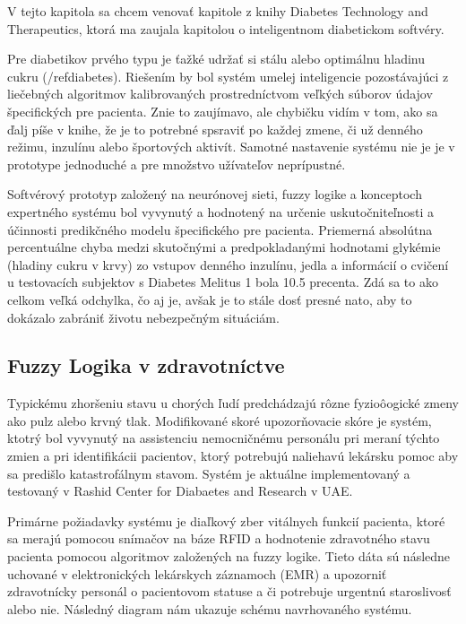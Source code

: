 V tejto kapitola sa chcem venovať kapitole z knihy Diabetes Technology and Therapeutics, ktorá ma zaujala kapitolou o inteligentnom diabetickom softvéry.

Pre diabetikov prvého typu je ťažké udržať si stálu alebo optimálnu hladinu cukru (/ref{diabetes}). Riešením by bol systém umelej inteligencie pozostávajúci z liečebných algoritmov kalibrovaných prostredníctvom veľkých súborov údajov špecifických pre pacienta.\cite{2000} Znie to zaujímavo, ale chybičku vidím v tom, ako sa ďalj píše v knihe, že je to potrebné spsraviť po každej zmene, či už denného režimu, inzulínu alebo športových aktivít. Samotné nastavenie systému nie je je v prototype jednoduché a pre množstvo užívateľov neprípustné. 

Softvérový prototyp založený na neurónovej sieti, fuzzy logike a konceptoch expertného systému bol vyvynutý a hodnotený na určenie uskutočniteľnosti a účinnosti predikčného modelu špecifického pre pacienta. Priemerná absolútna percentuálne chyba medzi skutočnými a predpokladanými hodnotami glykémie (hladiny cukru v krvy) zo vstupov denného inzulínu, jedla a informácií o cvičení u testovacích subjektov s Diabetes Melitus 1 bola 10.5 precenta.\cite{2000}
Zdá sa to ako celkom veľká odchylka, čo aj je, avšak je to stále dosť presné nato, aby to dokázalo zabrániť životu nebezpečným situáciám. 

\subsection{Fuzzy Logika v zdravotníctve}

Typickému zhoršeniu stavu u chorých ľudí predchádzajú rôzne fyzioôogické zmeny ako pulz alebo krvný tlak. Modifikované skoré upozorňovacie skóre je systém, ktotrý bol vyvynutý na assistenciu nemocničnému personálu pri meraní týchto zmien a pri identifikácii pacientov, ktorý potrebujú naliehavú lekársku pomoc aby sa predišlo katastrofálnym stavom. \cite{2019} Systém je aktuálne implementovaný a testovaný v Rashid Center for Diabaetes and Research v UAE.

Primárne požiadavky systému je diaľkový zber vitálnych funkcií pacienta, ktoré sa merajú pomocou snímačov na báze RFID a hodnotenie zdravotného stavu pacienta pomocou algoritmov založených na fuzzy logike.  Tieto dáta sú následne uchované v elektronických lekárskych záznamoch (EMR) a upozorniť zdravotnícky personál o pacientovom statuse a či potrebuje urgentnú staroslivosť alebo nie. \cite{2019} Následný diagram nám ukazuje schému navrhovaného systému.


